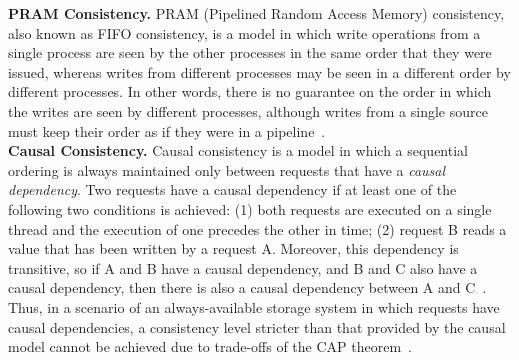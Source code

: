\noindent \textbf{PRAM Consistency.}
PRAM (Pipelined Random Access Memory) consistency, also known as FIFO consistency, is a model in which write operations from a single process are seen by the other processes in the same order that they were issued, whereas writes from different processes may be seen in a different order by different processes. In other words, there is no guarantee on the order in which the writes are seen by different processes, although writes from a single source must keep their order as if they were in a pipeline~\cite{lipton1988pram,tanenbaum:2007}. \\

\noindent \textbf{Causal Consistency.}
Causal consistency is a mod\-el in which a sequential ordering is always maintained only between requests that have a \textit{causal dependency}. Two requests have a causal dependency if at least one of the following two conditions is achieved: (1) both requests are executed on a single thread and the execution of one precedes the other in time; (2) request B reads a value that has been written by a request A. Moreover, this dependency is transitive, so if A and B have a causal dependency, and B and C also have a causal dependency, then there is also a causal dependency between A and C~\cite{tanenbaum:2007,Vogels:2009}.
Thus, in a scenario of an always-available storage system in which requests have causal dependencies, a consistency level stricter than that provided by the causal model cannot be achieved due to trade-offs of the CAP theorem~\cite{abadi2012consistency,mahajan2011consistency}. \\


